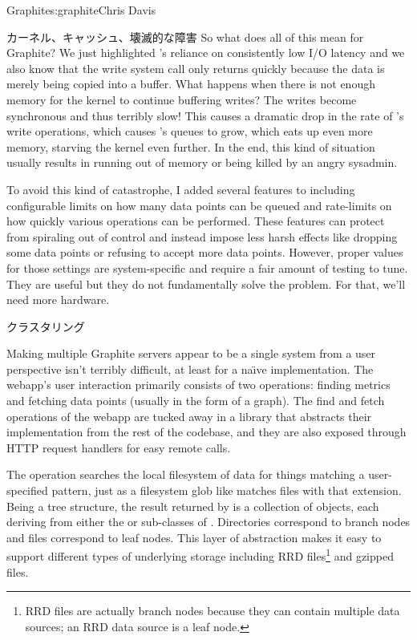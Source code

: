 \begin{aosachapter}{Graphite}{s:graphite}{Chris Davis}
\begin{aosasect1}{カーネル、キャッシュ、壊滅的な障害}
So what does all of this mean for Graphite? We just highlighted
's reliance on consistently low I/O latency and we also know
that the write system call only returns quickly because the data is
merely being copied into a buffer. What happens when there is not
enough memory for the kernel to continue buffering writes? The writes
become synchronous and thus terribly slow! This causes a dramatic drop
in the rate of 's write operations, which causes 's queues
to grow, which eats up even more memory, starving the kernel even
further. In the end, this kind of situation usually results in 
running out of memory or being killed by an angry sysadmin.

To avoid this kind of catastrophe, I added several features to 
including configurable limits on how many data points can be queued
and rate-limits on how quickly various  operations can be
performed.  These features can protect  from spiraling out of
control and instead impose less harsh effects like dropping some data
points or refusing to accept more data points. However, proper values
for those settings are system-specific and require a fair amount of
testing to tune. They are useful but they do not fundamentally solve
the problem.  For that, we'll need more hardware.

\end{aosasect1}

\begin{aosasect1}{クラスタリング}

Making multiple Graphite servers appear to be a single system from
a user perspective isn't terribly difficult, at least for a na\"{\i}ve
implementation.  The webapp's user interaction primarily consists of
two operations: finding metrics and fetching data points (usually in
the form of a graph). The find and fetch operations of the webapp are
tucked away in a library that abstracts their implementation from the
rest of the codebase, and they are also exposed through HTTP request
handlers for easy remote calls.

The  operation searches the local filesystem of 
data for things matching a user-specified pattern, just as a filesystem
glob like  matches files with that extension.
Being a tree structure, the result returned by  is a
collection of  objects, each deriving from either the  or
 sub-classes of . Directories correspond to branch nodes and
 files correspond to leaf nodes.  This layer of abstraction
makes it easy to support different types of underlying storage
including RRD files\footnote{RRD files are actually branch nodes
because they can contain multiple data sources; an RRD data source
is a leaf node.} and gzipped  files.


\end{aosasect1}
\end{aosachapter}
